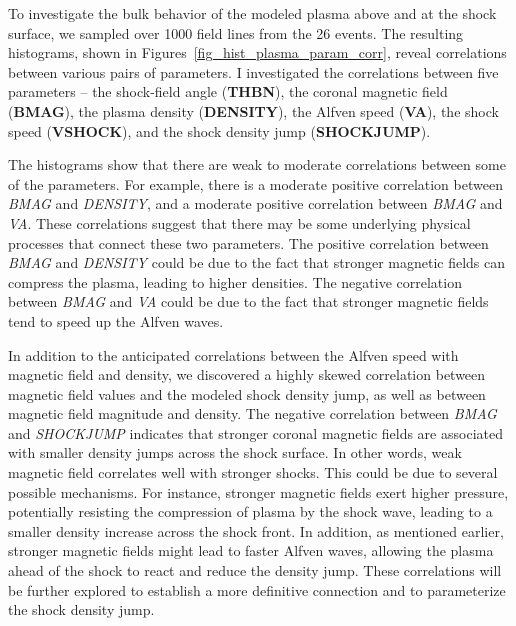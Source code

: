 To investigate the bulk behavior of the modeled plasma above and at the shock surface, we sampled over 1000 field lines from the 26 events. The resulting histograms, shown in Figures~\ref{fig_hist_plasma_param_corr}, reveal correlations between various pairs of parameters. 
I investigated the correlations between five parameters -- the shock-field angle (\textbf{THBN}), the coronal magnetic field (\textbf{BMAG}), the plasma density (\textbf{DENSITY}), the Alfven speed (\textbf{VA}), the shock speed (\textbf{VSHOCK}), and the shock density jump (\textbf{SHOCKJUMP}).

The histograms show that there are weak to moderate correlations between some of the parameters.
For example, there is a moderate positive correlation between \textit{BMAG} and \textit{DENSITY}, and a moderate positive correlation between \textit{BMAG} and \textit{VA}. These correlations suggest that there may be some underlying physical processes that connect these two parameters.
The positive correlation between \textit{BMAG} and \textit{DENSITY} could be due to the fact that stronger magnetic fields can compress the plasma, leading to higher densities.
The negative correlation between \textit{BMAG} and \textit{VA} could be due to the fact that stronger magnetic fields tend to speed up the Alfven waves.

In addition to the anticipated correlations between the Alfven speed with magnetic field and density, we discovered a highly skewed correlation between magnetic field values and the modeled shock density jump, as well as between magnetic field magnitude and density.
The negative correlation between \textit{BMAG} and \textit{SHOCKJUMP} indicates that stronger coronal magnetic fields are associated with smaller density jumps across the shock surface. In other words, weak magnetic field correlates well with stronger shocks.
This could be due to several possible mechanisms. For instance, stronger magnetic fields exert higher pressure, potentially resisting the compression of plasma by the shock wave, leading to a smaller density increase across the shock front.
In addition, as mentioned earlier, stronger magnetic fields might lead to faster Alfven waves, allowing the plasma ahead of the shock to react and reduce the density jump.
These correlations will be further explored to establish a more definitive connection and to parameterize the shock density jump.

